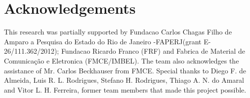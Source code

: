 \section*{Acknowledgements}
This research was partially supported by Fundacao Carlos Chagas Filho de Amparo a Pesquisa do Estado do Rio de Janeiro -FAPERJ(grant E-26/111.362/2012);
Fundacao Ricardo Franco (FRF) and Fabrica de Material de Comunicação e Eletronica (FMCE/IMBEL). The team also acknowledges the assistance of Mr. Carlos
Beckhauser from FMCE. Special thanks to Diego F. de Almeida, Luis R. L. Rodrigues, Stefano H. Rodrigues, Thiago A. N. do Amaral and Vitor L. H. Ferreira,
former team members that made this project possible.
